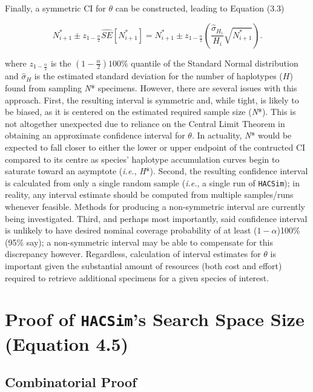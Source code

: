 Finally, a symmetric CI for $\theta$ can be constructed, leading to Equation (3.3)

\begin{equation}
N^*_{i+1} \pm z_{1-\frac{\alpha}{2}}\widehat{SE}[N^*_{i+1}] = N^*_{i+1} \pm z_{1-\frac{\alpha}{2}}\left(\frac{\hat{\sigma}_{H_i}}{H_i}\sqrt{N^*_{i+1}}\right).
\end{equation}

\noindent where $z_{1-\frac{\alpha}{2}}$ is the $(1-\frac{\alpha}{2})100\%$ quantile of the Standard Normal distribution and $\hat{\sigma}_{H}$ is the estimated standard deviation for the number of haplotypes ($H$) found from sampling \textit{N}* specimens.  However, there are several issues with this approach. First, the resulting interval is symmetric and, while tight, is likely to be biased, as it is centered on the estimated required sample size (\textit{N}*). This is not altogether unexpected due to reliance on the Central Limit Theorem in obtaining an approximate confidence interval for $\theta$. In actuality, \textit{N}* would be expected to fall closer to either the lower or upper endpoint of the contructed CI compared to its centre as species' haplotype accumulation curves begin to saturate toward an asymptote (\textit{i.e.}, \textit{H}*). Second, the resulting confidence interval is calculated from only a single random sample (\textit{i.e.}, a single run of {\tt HACSim}); in reality, any interval estimate should be computed from multiple samples/runs whenever feasible. Methods for producing a non-symmetric interval are currently being investigated. Third, and perhaps most importantly, said confidence interval is unlikely to have desired nominal coverage probability of at least 
($1 - \alpha$)100\% (95\% say); a non-symmetric interval may be able to compensate for this discrepancy however. Regardless, calculation of interval estimates for $\theta$ is important given the substantial amount of resources (both cost and effort) required to retrieve additional specimens for a given species of interest.

\chapter{Proof of {\tt HACSim}'s Search Space Size (Equation 4.5)}

\section{Combinatorial Proof}


